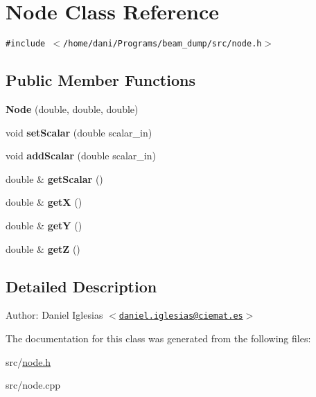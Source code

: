 \hypertarget{classNode}{
\section{Node Class Reference}
\label{classNode}
}
{\tt \#include $<$/home/dani/Programs/beam\_\-dump/src/node.h$>$}

\subsection*{Public Member Functions}
\begin{CompactItemize}
\item 
\hypertarget{classNode_b67eabb0fef1465a1d7d1e11997ddd4d}{
\textbf{Node} (double, double, double)}
\label{classNode_b67eabb0fef1465a1d7d1e11997ddd4d}

\item 
\hypertarget{classNode_93d1fc91852d3698d94625f0178df03f}{
void \textbf{setScalar} (double scalar\_\-in)}
\label{classNode_93d1fc91852d3698d94625f0178df03f}

\item 
\hypertarget{classNode_aa144bb5a91e238a24714f9c21e1f691}{
void \textbf{addScalar} (double scalar\_\-in)}
\label{classNode_aa144bb5a91e238a24714f9c21e1f691}

\item 
\hypertarget{classNode_d8c60fab754789ce7edcdc2bb78f9983}{
double \& \textbf{getScalar} ()}
\label{classNode_d8c60fab754789ce7edcdc2bb78f9983}

\item 
\hypertarget{classNode_d2fa288c9968379f4c89df5139614a8f}{
double \& \textbf{getX} ()}
\label{classNode_d2fa288c9968379f4c89df5139614a8f}

\item 
\hypertarget{classNode_fe88d7f675be192ca353270fcddeeac8}{
double \& \textbf{getY} ()}
\label{classNode_fe88d7f675be192ca353270fcddeeac8}

\item 
\hypertarget{classNode_1d9603c7a6e9d541643a78c8ffd7b336}{
double \& \textbf{getZ} ()}
\label{classNode_1d9603c7a6e9d541643a78c8ffd7b336}

\end{CompactItemize}


\subsection{Detailed Description}
\begin{Desc}
\item[Author:]Daniel Iglesias $<$\href{mailto:daniel.iglesias@ciemat.es}{\tt daniel.iglesias@ciemat.es}$>$ \end{Desc}


The documentation for this class was generated from the following files:\begin{CompactItemize}
\item 
src/\hyperlink{node_8h}{node.h}\item 
src/node.cpp\end{CompactItemize}

